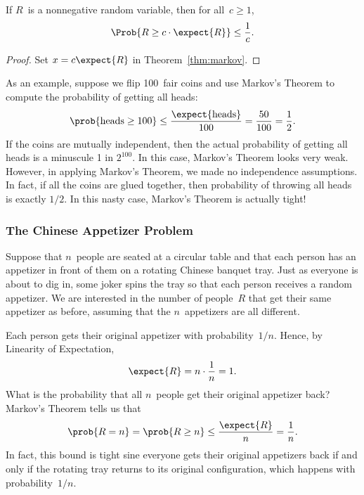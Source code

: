 \begin{corollary}
If $R$~is a nonnegative random variable, then for all~$c \geq 1$,
\begin{equation}
\Prob{R \geq c \cdot \expect{R}}
    \leq \frac{1}{c}.\label{markovaboveemean}
\end{equation}
\end{corollary}

\begin{proof}
    Set $x = c \expect{R}$ in Theorem~\ref{thm:markov}.
\end{proof}

As an example, suppose we flip 100~fair coins and use Markov's Theorem
to compute the probability of getting all heads:
\[
\prob{\text{heads} \geq 100} \leq \frac{\expect{\text{heads}}}{100} =
\frac{50}{100} = \frac{1}{2}.
\]
If the coins are mutually independent, then the actual probability of
getting all heads is a minuscule 1 in $2^{100}$.  In this case, Markov's
Theorem looks very weak.  However, in applying Markov's Theorem, we made
no independence assumptions.  In fact, if all the coins are glued
together, then probability of throwing all heads is exactly $1/2$.
In this nasty case, Markov's Theorem is actually tight!

\subsubsection{The Chinese Appetizer Problem}

Suppose that $n$~people are seated at a circular table and that each
person has an appetizer in front of them on a rotating Chinese banquet
tray.  Just as everyone is about to dig in, some joker spins the tray
so that each person receives a random appetizer.  We are interested in
the number of people~$R$ that get their same appetizer as before,
assuming that the $n$~appetizers are all different.

Each person gets their original appetizer with probability~$1/n$.
Hence, by Linearity of Expectation,
\begin{equation*}
    \expect{R} = n \cdot \frac{1}{n} = 1.
\end{equation*}
What is the probability that all $n$~people get their original
appetizer back?  Markov's Theorem tells us that
\begin{equation*}
\prob{R = n}
    = \prob{R \ge n} 
    \le \frac{\expect{R}}{n}
    = \frac{1}{n}.
\end{equation*}
In fact, this bound is tight sine everyone gets their original
appetizers back if and only if the rotating tray returns to its
original configuration, which happens with probability~$1/n$.

